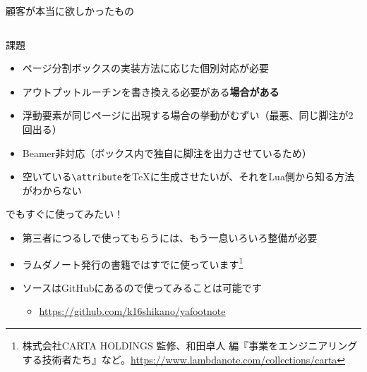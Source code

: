 \documentclass[unicode,14pt]{beamer}
\begin{document}
\begin{frame}[t]{顧客が本当に欲しかったもの}
\begin{columns}
\begin{column}{0.3\textwidth}
\end{column}
\end{columns}

\end{frame}

\begin{frame}[t]{課題}
\begin{itemize}
\item ページ分割ボックスの実装方法に応じた個別対応が必要
\item アウトプットルーチンを書き換える必要がある\textbf{場合がある}
\item 浮動要素が同じページに出現する場合の挙動がむずい（最悪、同じ脚注が2回出る）
\item Beamer非対応（ボックス内で独自に脚注を出力させているため）
\item 空いている\texttt{\textbackslash{}attribute}を\TeX{}に生成させたいが、それをLua側から知る方法がわからない
\end{itemize}

\end{frame}

\begin{frame}[t]{でもすぐに使ってみたい！}
\begin{itemize}
\item 第三者につるしで使ってもらうには、もう一息いろいろ整備が必要
\item ラムダノート発行の書籍ではすでに使っています\footnote{株式会社CARTA HOLDINGS 監修、和田卓人 編『事業をエンジニアリングする技術者たち』など。\url{https://www.lambdanote.com/collections/carta}}
\item ソースはGitHubにあるので使ってみることは可能です\\
  \begin{itemize}
\item \url{https://github.com/k16shikano/yafootnote}
  \end{itemize}
\end{itemize}
\end{frame}
\end{document}
